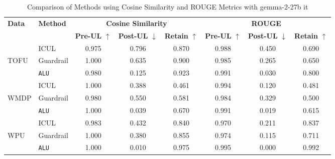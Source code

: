 \begin{table*}[]
    \centering
    \caption{Comparison of Methods using Cosine Similarity and ROUGE Metrics with gemma-2-27b it}
    \begin{tabular}{llccc|ccc}
        \toprule
        \textbf{Data}&\textbf{Method} & \multicolumn{3}{c}{\textbf{Cosine Similarity}} & \multicolumn{3}{c}{\textbf{ROUGE}} \\
        \cmidrule(lr){3-5} \cmidrule(lr){6-8}
         & & \textbf{Pre-UL} $\uparrow$ & \textbf{Post-UL} $\downarrow$ & \textbf{Retain} $\uparrow$ & \textbf{Pre-UL} $\uparrow$ & \textbf{Post-UL} $\downarrow$ & \textbf{Retain} $\uparrow$ \\
        \midrule
        &ICUL & 0.975 & 0.796 & 0.870 & 0.988 & 0.450 & 0.690 \\
        TOFU &Guardrail & 1.000 & 0.635 & 0.900 & 0.985 & 0.265 & 0.650 \\
        &\texttt{ALU}  & 0.980 & 0.125 & 0.923 & 0.991 & 0.030 & 0.800 \\
        \midrule
        &ICUL  & 1.000 & 0.388 & 0.461 & 0.994 & 0.120 & 0.481 \\
        WMDP & Guardrail & 0.980  & 0.550 & 0.581 & 0.984 & 0.329 & 0.500 \\
        &\texttt{ALU} & 1.000  & 0.039 & 0.670 & 0.991 & 0.019 & 0.615 \\
        \midrule
        &ICUL  & 0.983 & 0.432 & 0.840 & 0.970 & 0.211 & 0.837 \\
        WPU &Guardrail & 1.000 & 0.380 & 0.855 & 0.974 & 0.115 & 0.711 \\
        &\texttt{ALU} & 1.000 & 0.010 & 0.975 & 0.995 & 0.000 & 0.992 \\
        
        \bottomrule
    \end{tabular}
\label{tab:t23}    
\end{table*}

